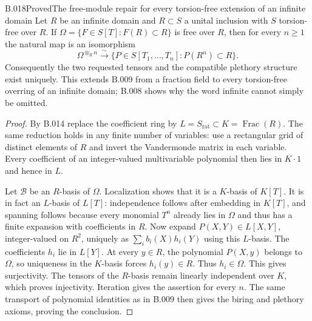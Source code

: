 \begin{saresult}{B.018}{Proved}{The free-module repair for every torsion-free extension of an infinite domain}
Let $R$ be an infinite domain and $R\subset S$ a unital inclusion
with $S$ torsion-free over $R$. If
$\Omega=\{F\in S[T]:F(R)\subset R\}$ is free over $R$, then
for every $n\ge1$ the natural map is an isomorphism
\[
 \Omega^{\otimes_R n}\xrightarrow{\sim}
 \{P\in S[T_1,\ldots,T_n]:P(R^n)\subset R\}.
\]
Consequently the two requested tensors and the compatible plethory
structure exist uniquely. This extends B.009 from a fraction field
to every torsion-free overring of an infinite domain; B.008 shows
why the word infinite cannot simply be omitted.
\end{saresult}
\begin{proof}
By B.014 replace the coefficient ring by
$L=S_{\mathrm{rat}}\subset K=\operatorname{Frac}(R)$.
The same reduction holds in any finite number of variables:
use a rectangular grid of distinct elements of $R$ and invert
the Vandermonde matrix in each variable. Every coefficient of an
integer-valued multivariable polynomial then lies in $K\cdot1$
and hence in $L$.

Let $\mathcal B$ be an $R$-basis of $\Omega$. Localization shows
that it is a $K$-basis of $K[T]$. It is in fact an $L$-basis of
$L[T]$: independence follows after embedding in $K[T]$, and
spanning follows because every monomial $T^n$ already lies in
$\Omega$ and thus has a finite expansion with coefficients in $R$.
Now expand $P(X,Y)\in L[X,Y]$, integer-valued on $R^2$, uniquely
as $\sum_i b_i(X)h_i(Y)$ using this $L$-basis. The coefficients
$h_i$ lie in $L[Y]$. At every $y\in R$, the polynomial $P(X,y)$
belongs to $\Omega$, so uniqueness in the $K$-basis forces
$h_i(y)\in R$. Thus $h_i\in\Omega$. This gives surjectivity.
The tensors of the $R$-basis remain linearly independent over $K$,
which proves injectivity. Iteration gives the assertion for every
$n$. The same transport of polynomial identities as in B.009
then gives the biring and plethory axioms, proving the conclusion.
\end{proof}

